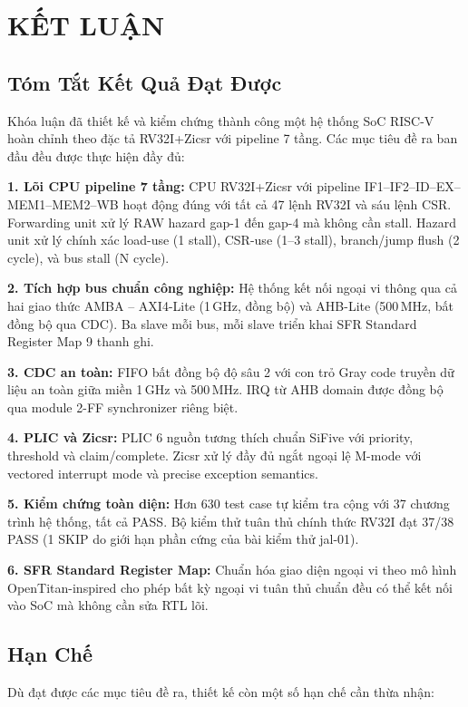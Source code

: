 \chapter{KẾT LUẬN}
\label{Chapter6}

\section{Tóm Tắt Kết Quả Đạt Được}

Khóa luận đã thiết kế và kiểm chứng thành công một hệ thống SoC RISC-V hoàn chỉnh theo đặc tả RV32I+Zicsr với pipeline 7 tầng. Các mục tiêu đề ra ban đầu đều được thực hiện đầy đủ:

\textbf{1. Lõi CPU pipeline 7 tầng:} CPU RV32I+Zicsr với pipeline IF1--IF2--ID--EX--MEM1--MEM2--WB hoạt động đúng với tất cả 47 lệnh RV32I và sáu lệnh CSR. Forwarding unit xử lý RAW hazard gap-1 đến gap-4 mà không cần stall. Hazard unit xử lý chính xác load-use (1 stall), CSR-use (1--3 stall), branch/jump flush (2 cycle), và bus stall (N cycle).

\textbf{2. Tích hợp bus chuẩn công nghiệp:} Hệ thống kết nối ngoại vi thông qua cả hai giao thức AMBA -- AXI4-Lite (1\,GHz, đồng bộ) và AHB-Lite (500\,MHz, bất đồng bộ qua CDC). Ba slave mỗi bus, mỗi slave triển khai SFR Standard Register Map 9 thanh ghi.

\textbf{3. CDC an toàn:} FIFO bất đồng bộ độ sâu 2 với con trỏ Gray code truyền dữ liệu an toàn giữa miền 1\,GHz và 500\,MHz. IRQ từ AHB domain được đồng bộ qua module 2-FF synchronizer riêng biệt.

\textbf{4. PLIC và Zicsr:} PLIC 6 nguồn tương thích chuẩn SiFive với priority, threshold và claim/complete. Zicsr xử lý đầy đủ ngắt ngoại lệ M-mode với vectored interrupt mode và precise exception semantics.

\textbf{5. Kiểm chứng toàn diện:} Hơn 630 test case tự kiểm tra cộng với 37 chương trình hệ thống, tất cả PASS. Bộ kiểm thử tuân thủ chính thức RV32I đạt 37/38 PASS (1 SKIP do giới hạn phần cứng của bài kiểm thử jal-01).

\textbf{6. SFR Standard Register Map:} Chuẩn hóa giao diện ngoại vi theo mô hình OpenTitan-inspired cho phép bất kỳ ngoại vi tuân thủ chuẩn đều có thể kết nối vào SoC mà không cần sửa RTL lõi.

\section{Hạn Chế}

Dù đạt được các mục tiêu đề ra, thiết kế còn một số hạn chế cần thừa nhận:

